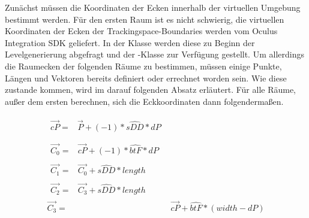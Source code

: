 Zunächst müssen die Koordinaten der Ecken innerhalb der virtuellen Umgebung bestimmt werden. Für den ersten Raum ist es nicht schwierig, die virtuellen Koordinaten der Ecken der Trackingspace-Boundaries werden vom Oculus Integration SDK geliefert.
In der  Klasse werden diese zu Beginn der Levelgenerierung abgefragt und der -Klasse zur Verfügung gestellt. Um allerdings die Raumecken der folgenden Räume zu bestimmen, müssen einige Punkte, Längen und Vektoren bereits definiert oder errechnet worden sein. Wie diese zustande kommen, wird im darauf folgenden Absatz erläutert. Für alle Räume, außer dem ersten berechnen, sich die Eckkoordinaten dann folgendermaßen.



    \begin{align}
        \begin{split}\label{eq:1}
            \vec{cP} ={}& \vec{P} + (-1) * \hat{sDD} * dP
        \end{split}\\ \\
        \begin{split}\label{eq:2}
            \vec{C_0} ={}& \vec{cP} + (-1) * \hat{btF} * dP
        \end{split}\\
        \begin{split}\label{eq:3}
            \vec{C_1} ={}& \vec{C_0} + \hat{sDD} * length
        \end{split}\\
        \begin{split}\label{eq:4}
            \vec{C_2} ={}& \vec{C_3} + \hat{sDD} * length
        \end{split}\\
            \vec{C_3} ={}& \vec{cP} + \hat{btF} * (width - dP)\label{eq:5}
        \end{align}

